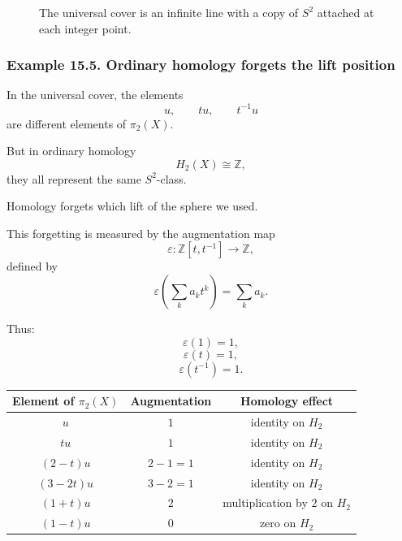 \documentclass[12pt,a4paper]{article}
\theoremstyle{notespace}
\begin{document}
\begin{figure}[htbp]
	\centering
	\caption{The universal cover is an infinite line with a copy of \(S^2\) attached at each integer point.}
\end{figure}

\subsubsection*{Example 15.5. Ordinary homology forgets the lift position}

In the universal cover, the elements
\[
u,
\qquad
tu,
\qquad
t^{-1}u
\]
are different elements of \(\pi_2(X)\).

But in ordinary homology
\[
H_2(X)\cong \mathbb Z,
\]
they all represent the same \(S^2\)-class.

Homology forgets which lift of the sphere we used.

This forgetting is measured by the augmentation map
\[
\varepsilon:\mathbb Z[t,t^{-1}]\to \mathbb Z,
\]
defined by
\[
\varepsilon\left(\sum_k a_k t^k\right)=\sum_k a_k.
\]

Thus:
\[
\varepsilon(1)=1,
\]
\[
\varepsilon(t)=1,
\]
\[
\varepsilon(t^{-1})=1.
\]

\begin{center}
	\renewcommand{\arraystretch}{1.25}
	\begin{tabular}{c|c|c}
		\textbf{Element of \(\pi_2(X)\)} & \textbf{Augmentation} & \textbf{Homology effect}\\
		\hline
		\(u\) & \(1\) & identity on \(H_2\)\\
		\(tu\) & \(1\) & identity on \(H_2\)\\
		\((2-t)u\) & \(2-1=1\) & identity on \(H_2\)\\
		\((3-2t)u\) & \(3-2=1\) & identity on \(H_2\)\\
		\((1+t)u\) & \(2\) & multiplication by \(2\) on \(H_2\)\\
		\((1-t)u\) & \(0\) & zero on \(H_2\)
	\end{tabular}
\end{center}
\end{document}
